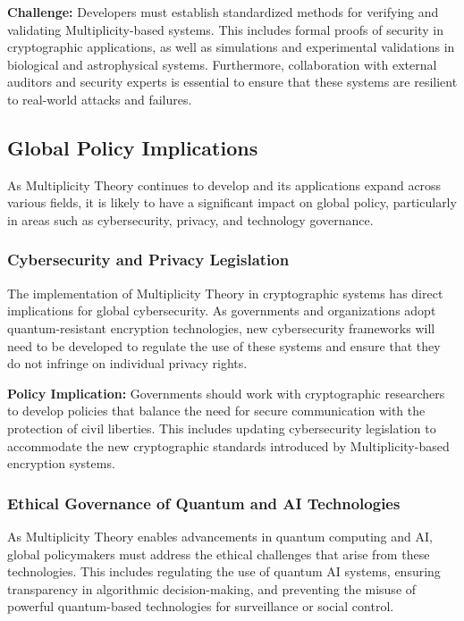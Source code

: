 \documentclass[%
 preprint, linenumbers,
 amsmath,amssymb,
 aps, physrev,
]{revtex4-2}
\begin{document}
\textbf{Challenge:} Developers must establish standardized methods for verifying and validating Multiplicity-based systems. This includes formal proofs of security in cryptographic applications, as well as simulations and experimental validations in biological and astrophysical systems. Furthermore, collaboration with external auditors and security experts is essential to ensure that these systems are resilient to real-world attacks and failures.

\subsection{Global Policy Implications}
As Multiplicity Theory continues to develop and its applications expand across various fields, it is likely to have a significant impact on global policy, particularly in areas such as cybersecurity, privacy, and technology governance.

\subsubsection{Cybersecurity and Privacy Legislation}
The implementation of Multiplicity Theory in cryptographic systems has direct implications for global cybersecurity. As governments and organizations adopt quantum-resistant encryption technologies, new cybersecurity frameworks will need to be developed to regulate the use of these systems and ensure that they do not infringe on individual privacy rights.

\textbf{Policy Implication:} Governments should work with cryptographic researchers to develop policies that balance the need for secure communication with the protection of civil liberties. This includes updating cybersecurity legislation to accommodate the new cryptographic standards introduced by Multiplicity-based encryption systems.

\subsubsection{Ethical Governance of Quantum and AI Technologies}
As Multiplicity Theory enables advancements in quantum computing and AI, global policymakers must address the ethical challenges that arise from these technologies. This includes regulating the use of quantum AI systems, ensuring transparency in algorithmic decision-making, and preventing the misuse of powerful quantum-based technologies for surveillance or social control.
\end{document}
